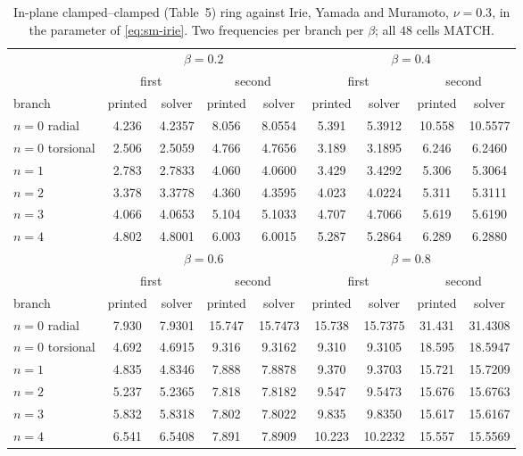 \documentclass[11pt]{article}
\begin{document}
\begin{center}\footnotesize
\begin{longtable}{lcccccccc}
\caption{In-plane clamped--clamped (Table~5) ring against Irie, Yamada and Muramoto, $\nu=0.3$, in the parameter of \eqref{eq:sm-irie}. Two frequencies per branch per $\beta$; all $48$ cells MATCH.}
\label{tab:sm-irie-t5}\\
\toprule
& \multicolumn{4}{c}{$\beta=0.2$} & \multicolumn{4}{c}{$\beta=0.4$}\\
\cmidrule(lr){2-5}\cmidrule(lr){6-9}
& \multicolumn{2}{c}{first} & \multicolumn{2}{c}{second} & \multicolumn{2}{c}{first} & \multicolumn{2}{c}{second}\\
branch & printed & solver & printed & solver & printed & solver & printed & solver\\
\midrule
$n=0$ radial & 4.236 & 4.2357 & 8.056 & 8.0554 & 5.391 & 5.3912 & 10.558 & 10.5577 \\
$n=0$ torsional & 2.506 & 2.5059 & 4.766 & 4.7656 & 3.189 & 3.1895 & 6.246 & 6.2460 \\
$n=1$ & 2.783 & 2.7833 & 4.060 & 4.0600 & 3.429 & 3.4292 & 5.306 & 5.3064 \\
$n=2$ & 3.378 & 3.3778 & 4.360 & 4.3595 & 4.023 & 4.0224 & 5.311 & 5.3111 \\
$n=3$ & 4.066 & 4.0653 & 5.104 & 5.1033 & 4.707 & 4.7066 & 5.619 & 5.6190 \\
$n=4$ & 4.802 & 4.8001 & 6.003 & 6.0015 & 5.287 & 5.2864 & 6.289 & 6.2880 \\
\midrule
& \multicolumn{4}{c}{$\beta=0.6$} & \multicolumn{4}{c}{$\beta=0.8$}\\
\cmidrule(lr){2-5}\cmidrule(lr){6-9}
& \multicolumn{2}{c}{first} & \multicolumn{2}{c}{second} & \multicolumn{2}{c}{first} & \multicolumn{2}{c}{second}\\
branch & printed & solver & printed & solver & printed & solver & printed & solver\\
\midrule
$n=0$ radial & 7.930 & 7.9301 & 15.747 & 15.7473 & 15.738 & 15.7375 & 31.431 & 31.4308 \\
$n=0$ torsional & 4.692 & 4.6915 & 9.316 & 9.3162 & 9.310 & 9.3105 & 18.595 & 18.5947 \\
$n=1$ & 4.835 & 4.8346 & 7.888 & 7.8878 & 9.370 & 9.3703 & 15.721 & 15.7209 \\
$n=2$ & 5.237 & 5.2365 & 7.818 & 7.8182 & 9.547 & 9.5473 & 15.676 & 15.6763 \\
$n=3$ & 5.832 & 5.8318 & 7.802 & 7.8022 & 9.835 & 9.8350 & 15.617 & 15.6167 \\
$n=4$ & 6.541 & 6.5408 & 7.891 & 7.8909 & 10.223 & 10.2232 & 15.557 & 15.5569 \\
\bottomrule
\end{longtable}
\end{center}
\end{document}
